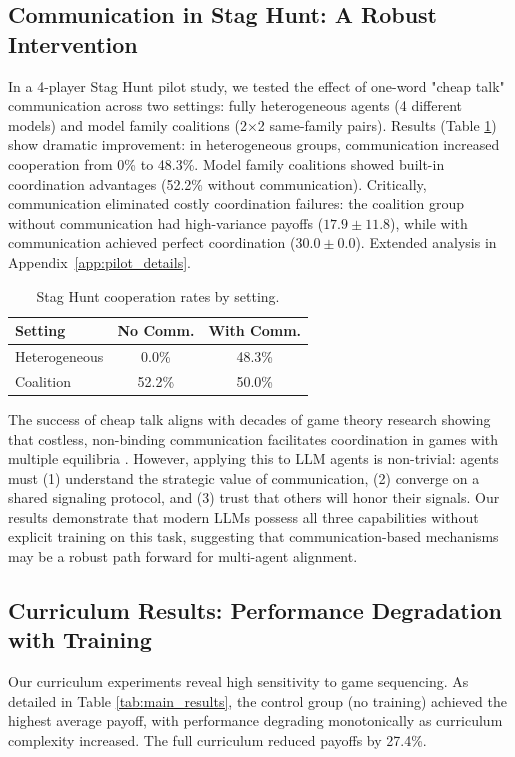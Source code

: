 \documentclass[11pt]{article}
\begin{document}
\subsection{Communication in Stag Hunt: A Robust Intervention}
In a 4-player Stag Hunt pilot study, we tested the effect of one-word "cheap talk" communication across two settings: fully heterogeneous agents (4 different models) and model family coalitions (2×2 same-family pairs). Results (Table \ref{tab:stag_hunt_results}) show dramatic improvement: in heterogeneous groups, communication increased cooperation from 0\% to 48.3\%. Model family coalitions showed built-in coordination advantages (52.2\% without communication). Critically, communication eliminated costly coordination failures: the coalition group without communication had high-variance payoffs ($17.9 \pm 11.8$), while with communication achieved perfect coordination ($30.0 \pm 0.0$). Extended analysis in Appendix~\ref{app:pilot_details}.

\begin{table}[h]
  \caption{Stag Hunt cooperation rates by setting.}
  \label{tab:stag_hunt_results}
  \centering
  \small
  \begin{tabular}{lcc}
    \toprule
    Setting & No Comm. & With Comm. \\
    \midrule
    Heterogeneous & 0.0\% & 48.3\% \\
    Coalition & 52.2\% & 50.0\% \\
    \bottomrule
  \end{tabular}
\end{table}

The success of cheap talk aligns with decades of game theory research showing that costless, non-binding communication facilitates coordination in games with multiple equilibria \citep{farrell1987cheap}. However, applying this to LLM agents is non-trivial: agents must (1) understand the strategic value of communication, (2) converge on a shared signaling protocol, and (3) trust that others will honor their signals. Our results demonstrate that modern LLMs possess all three capabilities without explicit training on this task, suggesting that communication-based mechanisms may be a robust path forward for multi-agent alignment.


\subsection{Curriculum Results: Performance Degradation with Training}
Our curriculum experiments reveal high sensitivity to game sequencing. As detailed in Table \ref{tab:main_results}, the control group (no training) achieved the highest average payoff, with performance degrading monotonically as curriculum complexity increased. The full curriculum reduced payoffs by 27.4\%.
\end{document}

